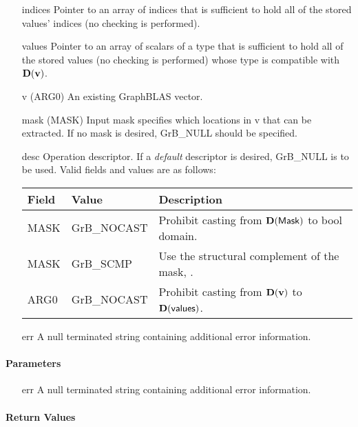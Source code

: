 \begin{itemize}[leftmargin=1.1in]
    \item[{\sf indices}] Pointer to an array of indices that is sufficient to
                        hold all of the stored values' indices (no checking is performed).
    \item[{\sf values}] Pointer to an array of scalars of a type that is sufficient to
                        hold all of the stored values (no checking is performed) whose
                        type is compatible with $\bold{D}({\bf v})$.
    \item[{\sf v}]      ({\sf ARG0}) An existing GraphBLAS vector.
    \item[{\sf mask}]   ({\sf MASK}) Input mask specifies which locations in
                        {\sf v} that can be extracted.  If no mask is desired,
                        {\sf GrB\_NULL} should be specified.
    \item[{\sf desc}]   Operation descriptor. If a
    \emph{default} descriptor is desired, {\sf GrB\_NULL} is to be
    used.  Valid fields and values are as follows: \\
    \begin{tabular}{lll}
    Field  & Value & Description \\
    \hline
    {\sf MASK} & {\sf GrB\_NOCAST} & Prohibit casting from $\bold{D}({\sf Mask})$ to {\sf bool} domain. \\
    {\sf MASK} & {\sf GrB\_SCMP}   & Use the structural complement of the mask, . \\
    {\sf ARG0} & {\sf GrB\_NOCAST} & Prohibit casting from $\bold{D}({\bf v})$ to $\bold{D}({\sf values})$. \\
    \end{tabular}
    \item[{\sf err}]     A null terminated string containing additional error information.
\end{itemize}

\paragraph{Parameters}
\begin{itemize}
 \item[{\sf err}]     A null terminated string containing additional error information.
\end{itemize}


\paragraph{Return Values}

